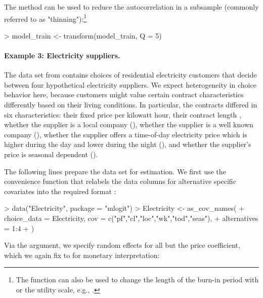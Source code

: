 \documentclass[article,shortnames]{jss}
\newcommand{\fct}[1]{\code{#1()}}
\begin{document}
The \fct{transform} method can be used to reduce the autocorrelation in a subsample (commonly referred to as "thinning"):\footnote{The function can also be used to change the length of the burn-in period with  or the utility scale, e.g., .}

\begin{Schunk}
\begin{Sinput}
> model_train <- transform(model_train, Q = 5)
\end{Sinput}
\end{Schunk}

\paragraph{Example 3: Electricity suppliers.}

The  data set from  contains choices of residential electricity customers that decide between four hypothetical electricity suppliers. We expect heterogeneity in choice behavior here, because customers might value certain contract characteristics differently based on their living conditions. In particular, the contracts differed in six characteristics: their fixed price  per kilowatt hour, their contract length , whether the supplier is a local company (), whether the supplier is a well known company (), whether the supplier offers a time-of-day electricity price which is higher during the day and lower during the night (), and whether the supplier's price is seasonal dependent ().

The following lines prepare the data set for estimation. We first use the convenience function \fct{as\_cov\_names} that relabels the data columns for alternative specific covariates into the required format :

\begin{Schunk}
\begin{Sinput}
> data("Electricity", package = "mlogit")
> Electricity <- as_cov_names(
+    choice_data = Electricity, cov = c("pf","cl","loc","wk","tod","seas"),
+    alternatives = 1:4
+  )
\end{Sinput}
\end{Schunk}

Via the  argument, we specify random effects for all but the price coefficient, which we again fix to  for monetary interpretation:
\end{document}
